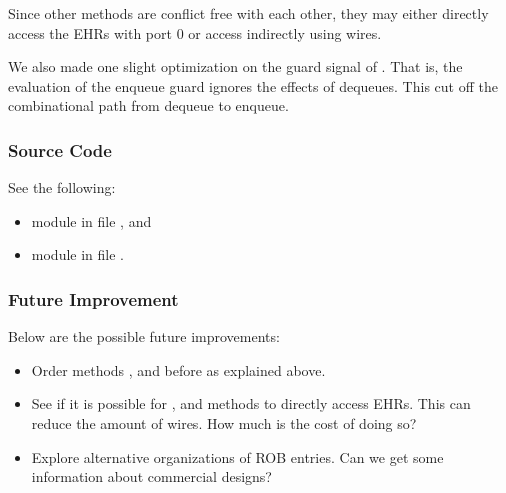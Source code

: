 Since other methods are conflict free with each other, they may either directly access the EHRs with port 0 or access indirectly using wires.

We also made one slight optimization on the guard signal of .
That is, the evaluation of the enqueue guard ignores the effects of dequeues.
This cut off the combinational path from dequeue to enqueue.

\subsubsection{Source Code}
See the following:
\begin{itemize}
    \item module  in file , and
    \item module  in file .
\end{itemize}

\subsubsection{Future Improvement}
Below are the possible future improvements:
\begin{itemize}
    \item Order methods ,  and  before  as explained above.
    
    \item See if it is possible for ,  and  methods to directly access EHRs.
    This can reduce the amount of wires.
    How much is the cost of doing so?
    
    \item Explore alternative organizations of ROB entries. Can we get some information about commercial designs?
\end{itemize}